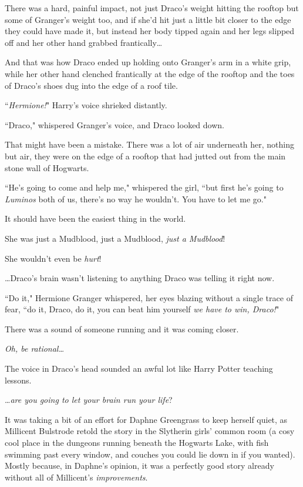There was a hard, painful impact, not just Draco's weight hitting the rooftop but some of Granger's weight too, and if she'd hit just a little bit closer to the edge they could have made it, but instead her body tipped again and her legs slipped off and her other hand grabbed frantically{\ldots}

And that was how Draco ended up holding onto Granger's arm in a white grip, while her other hand clenched frantically at the edge of the rooftop and the toes of Draco's shoes dug into the edge of a roof tile.

``\emph{Hermione!}" Harry's voice shrieked distantly.

``Draco," whispered Granger's voice, and Draco looked down.

That might have been a mistake. There was a lot of air underneath her, nothing but air, they were on the edge of a rooftop that had jutted out from the main stone wall of Hogwarts.

``He's going to come and help me," whispered the girl, ``but first he's going to \emph{Luminos} both of us, there's no way he wouldn't. You have to let me go."

It should have been the easiest thing in the world.

She was just a Mudblood, just a Mudblood, \emph{just a Mudblood}!

She wouldn't even be \emph{hurt}!

{\ldots}Draco's brain wasn't listening to anything Draco was telling it right now.

``Do it," Hermione Granger whispered, her eyes blazing without a single trace of fear, ``do it, Draco, do it, you can beat him yourself \emph{we have to win, Draco!}"

There was a sound of someone running and it was coming closer.

\emph{Oh, be rational{\ldots}}

The voice in Draco's head sounded an awful lot like Harry Potter teaching lessons.

{\ldots}\emph{are you going to let your brain run your life}?


It was taking a bit of an effort for Daphne Greengrass to keep herself quiet, as Millicent Bulstrode retold the story in the Slytherin girls' common room (a cosy cool place in the dungeons running beneath the Hogwarts Lake, with fish swimming past every window, and couches you could lie down in if you wanted). Mostly because, in Daphne's opinion, it was a perfectly good story already without all of Millicent's \emph{improvements}.

